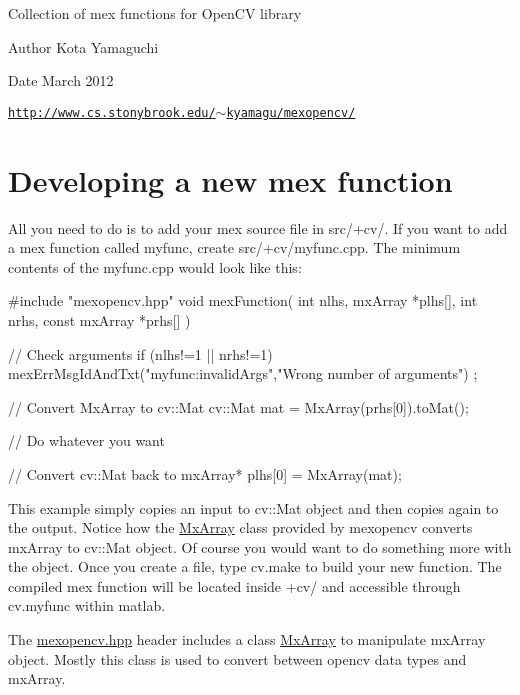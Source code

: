 \-Collection of mex functions for \-Open\-C\-V library \begin{DoxyAuthor}{\-Author}
\-Kota \-Yamaguchi 
\end{DoxyAuthor}
\begin{DoxyDate}{\-Date}
\-March 2012
\end{DoxyDate}
\href{http://www.cs.stonybrook.edu/~kyamagu/mexopencv/}{\tt http\-://www.\-cs.\-stonybrook.\-edu/$\sim$kyamagu/mexopencv/}\hypertarget{index_development}{}\section{\-Developing a new mex function}\label{index_development}
\-All you need to do is to add your mex source file in {\ttfamily src/+cv/}. \-If you want to add a mex function called myfunc, create {\ttfamily src/+cv/myfunc}.cpp. \-The minimum contents of the myfunc.\-cpp would look like this\-:


\begin{DoxyCode}
    #include "mexopencv.hpp"
    void mexFunction( int nlhs, mxArray *plhs[],
                      int nrhs, const mxArray *prhs[] )
    {
        // Check arguments
        if (nlhs!=1 || nrhs!=1)
            mexErrMsgIdAndTxt("myfunc:invalidArgs","Wrong number of arguments")
      ;
        
        // Convert MxArray to cv::Mat
        cv::Mat mat = MxArray(prhs[0]).toMat();
        
        // Do whatever you want
        
        // Convert cv::Mat back to mxArray*
        plhs[0] = MxArray(mat);
    }
\end{DoxyCode}


\-This example simply copies an input to cv\-::\-Mat object and then copies again to the output. \-Notice how the {\ttfamily \hyperlink{class_mx_array}{\-Mx\-Array}} class provided by mexopencv converts mx\-Array to cv\-::\-Mat object. \-Of course you would want to do something more with the object. \-Once you create a file, type {\ttfamily cv.\-make} to build your new function. \-The compiled mex function will be located inside {\ttfamily +cv/} and accessible through {\ttfamily cv.\-myfunc} within matlab.

\-The {\ttfamily \hyperlink{mexopencv_8hpp}{mexopencv.\-hpp}} header includes a class {\ttfamily \hyperlink{class_mx_array}{\-Mx\-Array}} to manipulate {\ttfamily mx\-Array} object. \-Mostly this class is used to convert between opencv data types and {\ttfamily mx\-Array}.


